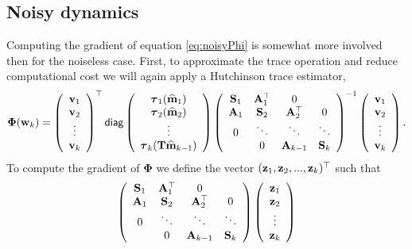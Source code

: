 \documentclass[11pt]{article}
\newcommand{\bfA}	{{\bf{A}}}
\newcommand{\bfS}	{{\bf{S}}}
\newcommand{\bfT}	{{\bf{T}}}
\newcommand{\bfm}	{{\bf{m}}}
\newcommand{\bfv}	{{\bf{v}}}
\newcommand{\bfw}	{{\bf{w}}}
\newcommand{\bfz}	{{\bf{z}}}
\newcommand{\bfPhi}     {{\boldsymbol \Phi}}
\newcommand{\bftau}      {{\boldsymbol \tau}}
\newcommand{\bfmhat}    {{\widehat{\bfm}}}
\renewcommand{\bfmhat}	{\widehat{\bf m}}
\begin{document}
{\subsection{Noisy dynamics}

Computing the gradient of equation \eqref{eq:noisyPhi} is somewhat more involved then for the noiseless case. 
First, to approximate the trace operation and reduce computational cost we will again apply a Hutchinson trace estimator,
\begin{equation}
\bfPhi(\bfw_k) =  
\left(\begin{array}{c} \bfv_1 \\ \bfv_2\\ \vdots\\ \bfv_k \end{array}\right)^{\top}
{\sf diag}
\left( \begin{array}{c}
\bftau_1(\bfmhat_1) \\ 
\bftau_2(\bfmhat_2)  \\
\vdots \\
\bftau_k(\bfT\bfmhat_{k-1})\end{array}\right)
\left(\begin{array}{cccc}
 \bfS_1 &  \bfA^{\top}_1 & 0 & \\
 \bfA_1 & \bfS_2 & \bfA^{\top}_2 & 0 \\
 0 & \ddots & \ddots & \ddots \\
 & 0 & \bfA_{k-1} & \bfS_k
  \end{array}\right)^{-1}
  \left(\begin{array}{c} \bfv_1 \\ \bfv_2\\ \vdots\\ \bfv_k \end{array}\right).
\end{equation}
To compute the gradient of $\bfPhi$ we define the vector  $(\bfz_1,\bfz_2,...,\bfz_k)^{\top}$ such that
\begin{equation}
\left(\begin{array}{cccc}
 \bfS_1 &  \bfA^{\top}_1 & 0 & \\
 \bfA_1 & \bfS_2 & \bfA^{\top}_2 & 0 \\
 0 & \ddots & \ddots & \ddots \\
 & 0 & \bfA_{k-1} & \bfS_k
  \end{array}\right)
  \left(\begin{array}{c} \bfz_1 \\ \bfz_2\\ \vdots\\ \bfz_k \end{array}\right)

\end{equation}}
\end{document}
